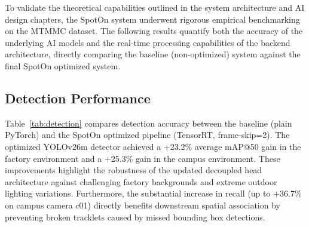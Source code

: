 To validate the theoretical capabilities outlined in the system architecture and AI design chapters, the SpotOn system underwent rigorous empirical benchmarking on the MTMMC dataset. The following results quantify both the accuracy of the underlying AI models and the real-time processing capabilities of the backend architecture, directly comparing the baseline (non-optimized) system against the final SpotOn optimized system.

\subsection{Detection Performance}
\label{subsec:detection-results}

Table~\ref{tab:detection} compares detection accuracy between the baseline (plain PyTorch) and the SpotOn optimized pipeline (TensorRT, frame-skip=2). The optimized YOLOv26m detector achieved a +23.2\% average mAP@50 gain in the factory environment and a +25.3\% gain in the campus environment. These improvements highlight the robustness of the updated decoupled head architecture against challenging factory backgrounds and extreme outdoor lighting variations. Furthermore, the substantial increase in recall (up to +36.7\% on campus camera c01) directly benefits downstream spatial association by preventing broken tracklets caused by missed bounding box detections.

